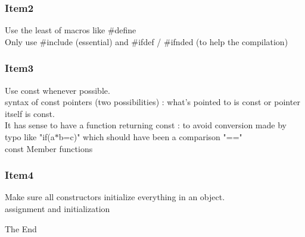 \documentclass{beamer}
\begin{document}
\begin{frame}
\frametitle{Item2}
Use the least of macros like \#define \\
Only use \#include (essential) and \#ifdef / \#ifnded (to help the compilation)
\end{frame}

\begin{frame}
\frametitle{Item3}
Use const whenever possible. \\
syntax of const pointers (two possibilities) : what's pointed to is const or pointer itself is const. \\

It has sense to have a function returning const : to avoid conversion made by typo like "if(a$\ast$b=c)" which should have been a comparison "==" \\

const Member functions

\end{frame}

\begin{frame}
\frametitle{Item4}
Make sure all constructors initialize everything in an object. \\

assignment and initialization

\end{frame}



\begin{frame}
\Huge{\centerline{The End}}
\end{frame}

\end{document}
